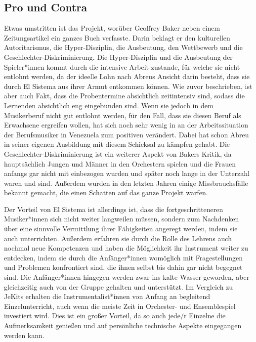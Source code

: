 \subsection{Pro und Contra}
Etwas umstritten ist das Projekt, worüber Geoffrey Baker neben einem
Zeitungsartikel ein ganzes Buch verfasste. Darin beklagt er den kulturellen
Autoritarismus, die Hyper-Disziplin, die Ausbeutung, den Wettbewerb und die
Geschlechter-Diskriminierung. Die Hyper-Disziplin und die Ausbeutung der
Spieler*innen kommt durch die intensive Arbeit zustande, für welche sie nicht
entlohnt werden, da der ideelle Lohn nach Abreus Ansicht darin besteht, dass sie durch El
Sistema aus ihrer Armut entkommen können. Wie zuvor beschrieben, ist aber auch
Fakt, dass die Probentermine absichtlich zeitintensiv sind, sodass die Lernenden
absichtlich eng eingebunden sind. Wenn sie jedoch in dem Musikerberuf
nicht gut entlohnt werden, für den Fall, dass sie diesen Beruf als Erwachsene
ergreifen wollen, hat sich noch sehr wenig in an der Arbeitssituation der
Berufsmusiker in Venezuela zum positiven verändert. Dabei hat schon
Abreu in seiner eigenen Ausbildung mit diesem Schicksal zu kämpfen gehabt. Die
Geschlechter-Diskriminierung ist ein weiterer Aspekt von Bakers Kritik, da
hauptsächlich Jungen und Männer in den Orchestern spielen und die Frauen anfangs
gar nicht mit einbezogen wurden und später noch lange in der Unterzahl waren und
sind. Außerdem wurden in den letzten Jahren einige
Missbrauchsfälle bekannt gemacht, die einen Schatten auf das ganze Projekt
warfen. 

Der Vorteil von El Sistema ist allerdings ist, dass die fortgeschritteneren
Musiker*innen sich nicht weiter langweilen müssen, sondern zum Nachdenken über
eine sinnvolle Vermittlung ihrer Fähigkeiten angeregt werden, indem sie auch
unterrichten. Außerdem erfahren sie durch die Rolle des Lehrens auch nochmal
neue Kompetenzen und haben die Möglichkeit ihr Instrument weiter zu entdecken,
indem sie durch die Anfänger*innen womöglich mit Fragestellungen und Problemen
konfrontiert sind, die ihnen selbst bis dahin gar nicht begegnet sind. Die
Anfänger*innen hingegen werden zwar ins kalte Wasser geworden, aber gleichzeitig
auch von der Gruppe gehalten und unterstützt.
\autocite[160]{roebke_mantilla:vom_wilden_lernen}
Im Vergleich zu JeKits erhalten die Instrumentalist*innen von Anfang an
begleitend Einzelunterricht, auch wenn die meiste Zeit in
Orchester- und Ensemblespiel investiert wird. Dies ist ein großer Vorteil, da so
auch jede/r Einzelne die Aufmerksamkeit genießen und auf persönliche technische
Aspekte eingegangen werden kann. 
